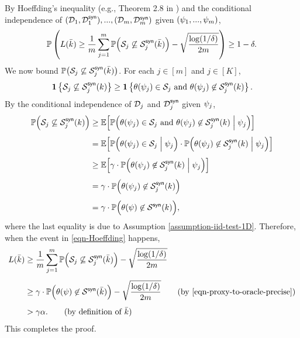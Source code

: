 By Hoeffding's inequality (e.g., Theorem 2.8 in \cite{BLM13}) and the conditional independence of $(\mathcal{D}_1,\mathcal{D}^{\mathsf{syn}}_1),...,(\mathcal{D}_m,\mathcal{D}^{\mathsf{syn}}_m)$ given $(\psi_1,...,\psi_m)$,
\begin{equation}\label{eqn-Hoeffding}
\mathbb{P}\left( L(\bar{k}) \ge \frac{1}{m} \sum_{j=1}^m \mathbb{P}\Big( {\mathcal{S}}_j \not\subseteq {\mathcal{S}}^{\mathsf{syn}}_j(\bar{k}) \Big) -  \sqrt{\frac{\log(1/\delta)}{2m}} \right) \ge 1-\delta.
\end{equation}
We now bound $\mathbb{P}\big( {\mathcal{S}}_j \not\subseteq {\mathcal{S}}^{\mathsf{syn}}_j(\bar{k}) \big)$. For each $j\in[m]$ and $j\in[K]$,
\[
\operatorname{\mathbf{1}} \left\{ {\mathcal{S}}_j \not\subseteq {\mathcal{S}}^{\mathsf{syn}}_j(k) \right\}
\ge 
\operatorname{\mathbf{1}} \left\{ \theta (\psi_j) \in {\mathcal{S}}_j \text{ and } \theta (\psi_j) \not\in {\mathcal{S}}^{\mathsf{syn}}_j(k) \right\}.
\]
By the conditional independence of $\mathcal{D}_j$ and $\mathcal{D}^{\mathsf{syn}}_j$ given $\psi_j$,
\begin{align}
\mathbb{P} \Big( {\mathcal{S}}_j \not\subseteq {\mathcal{S}}^{\mathsf{syn}}_j(k) \Big)
&\ge
\mathbb{E}\Big[ \mathbb{P} \Big( \theta (\psi_j) \in {\mathcal{S}}_j \text{ and } \theta (\psi_j) \not\in {\mathcal{S}}^{\mathsf{syn}}_j(k)  \Bigm| \psi_j \Big) \Big] \notag \\[4pt]
&=
\mathbb{E}\Big[ \mathbb{P} \Big( \theta (\psi_j) \in {\mathcal{S}}_j \Bigm| \psi_j \Big) \cdot \mathbb{P} \Big( \theta (\psi_j) \not\in {\mathcal{S}}^{\mathsf{syn}}_j(k)  \Bigm| \psi_j \Big) \Big] \notag \\[4pt]
&\ge
\mathbb{E}\Big[ \gamma \cdot \mathbb{P} \Big( \theta (\psi_j) \not\in {\mathcal{S}}^{\mathsf{syn}}_j (k) \Bigm| \psi_j \Big) \Big] \notag \\[4pt]
&=
\gamma \cdot \mathbb{P}\Big( \theta (\psi_j) \not\in {\mathcal{S}}^{\mathsf{syn}}_j(k)  \Big) \notag \\[4pt]
&=
\gamma \cdot \mathbb{P}\Big( \theta (\psi)  \not\in {\mathcal{S}}^{\mathsf{syn}}(k)  \Big), \label{eqn-proxy-to-oracle-precise}
\end{align}
where the last equality is due to Assumption \ref{assumption-iid-test-1D}. Therefore, when the event in \eqref{eqn-Hoeffding} happens,
\begin{align*}
\coveragealt(\bar{k}) 
&
\ge \frac{1}{m} \sum_{j=1}^m \PP \Big( \CIalt_j \not\subseteq \simCIalt_j(\bar{k}) \Big) -  \sqrt{\frac{\log(1/\delta)}{2m}} \\[4pt]
&\ge 
\gamma \cdot \PP\Big( \statistic (\testfunction)  \not\in \simCIalt(\bar{k}) \Big) -  \sqrt{\frac{\log(1/\delta)}{2m}} \tag{by \eqref{eqn-proxy-to-oracle-precise}} \\[4pt]
&> 
\gamma\alpha. \tag{by definition of $\bar{k}$}
\end{align*}
This completes the proof.